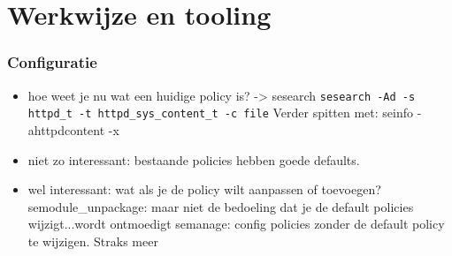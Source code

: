\section{Werkwijze en tooling}
\begin{frame}
    \frametitle{Configuratie}
\begin{itemize}
\pause
\item  hoe weet je nu wat een huidige policy is? -> \pause sesearch
\pause
{\tt sesearch -Ad -s httpd\_t -t httpd\_sys\_content\_t -c file}
Verder spitten met: seinfo -ahttpdcontent -x
\item niet zo interessant: bestaande policies hebben goede defaults.
\item wel interessant: wat als je de policy wilt aanpassen of toevoegen? 
semodule_unpackage: maar niet de bedoeling dat je de default policies wijzigt...wordt ontmoedigt
semanage: config policies zonder de default policy te wijzigen. Straks meer
\end{itemize}
\end{frame}

